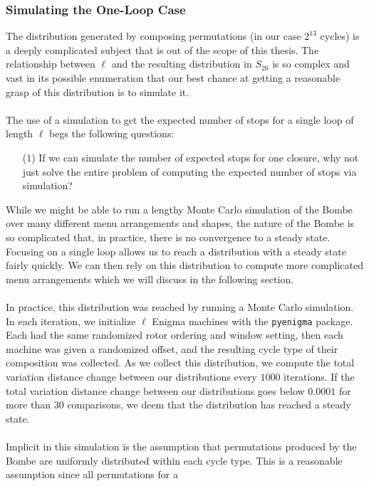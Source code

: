 \subsubsection{Simulating the One-Loop Case}
The distribution generated by composing permutations (in our case
$2^{13}$ cycles) is a deeply complicated subject that is out of the
scope of this thesis. The relationship between $\ell$ and the
resulting distribution in $S_{26}$ is so complex and vast in its
possible enumeration that our best chance at getting a reasonable
grasp of this distribution is to simulate it.
\\\\The use of a simulation to get the expected number of stops for a
single loop of length $\ell$ begs the following questions:
\begin{enumerate}
  \item[(1)] If we can simulate the number of expected stops for one
    closure, why not just solve the entire problem of computing the
    expected number of stops via simulation?
\end{enumerate}
While we might be able to run a lengthy Monte Carlo simulation of the
Bombe over many different menu arrangements and shapes, the nature of
the Bombe is so complicated that, in practice, there is no convergence
to a steady state. Focusing on a single loop allows us to reach a
distribution with a steady state fairly quickly. We can then rely on
this distribution to compute more complicated menu arrangements which
we will discuss in the following section.
\\\\In practice, this distribution was reached by running a Monte
Carlo simulation. In each iteration, we initialize $\ell$ Enigma
machines with the \texttt{pyenigma} package. Each had the same
randomized rotor ordering and window setting, then each machine was
given a randomized offset, and the resulting cycle type of their
composition was collected. As we collect this distribution, we
compute the total variation distance change between our distributions
every $1000$ iterations. If the total variation distance change
between our distributions goes below $0.0001$ for more than $30$
comparisons, we deem that the distribution has reached a steady state.
\\\\Implicit in this simulation is the assumption that permutations
produced by the Bombe are uniformly distributed within each cycle
type. This is a reasonable assumption since all permutations for a
